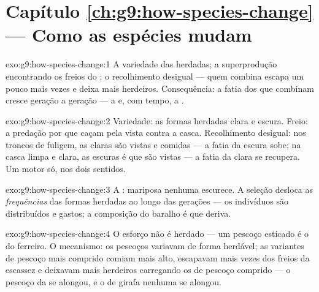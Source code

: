 \section*{Capítulo \ref{ch:g9:how-species-change} --- Como as espécies mudam}

\begin{solution}{exo:g9:how-species-change:1}
A variedade das  herdadas; a superprodução
encontrando os freios do ; o recolhimento desigual
--- quem combina escapa um pouco mais vezes e deixa mais
herdeiros. Consequência: a fatia dos  que combinam
cresce geração a geração --- a  e, com tempo,
a .
\end{solution}

\begin{solution}{exo:g9:how-species-change:2}
Variedade: as formas herdadas clara e escura. Freio: a
predação por  que caçam pela vista contra a casca.
Recolhimento desigual: nos troncos de fuligem, as claras são
vistas e comidas --- a fatia da escura sobe; na casca limpa e
clara, as escuras é que são vistas --- a fatia da clara se
recupera. Um motor só, nos dois sentidos.
\end{solution}

\begin{solution}{exo:g9:how-species-change:3}
A : mariposa nenhuma escurece. A seleção desloca as
\emph{frequências} das formas herdadas ao longo das gerações
--- os indivíduos são distribuídos e gastos; a composição do
baralho é que deriva.
\end{solution}

\begin{solution}{exo:g9:how-species-change:4}
O esforço não é herdado --- um pescoço esticado é o  do
ferreiro. O mecanismo: os pescoços variavam de forma
herdável; as variantes de pescoço mais comprido comiam mais
alto, escapavam mais vezes dos freios da escassez e deixavam
mais herdeiros carregando os  de pescoço comprido --- o
pescoço da  se alongou, e o de girafa nenhuma se
alongou.
\end{solution}

